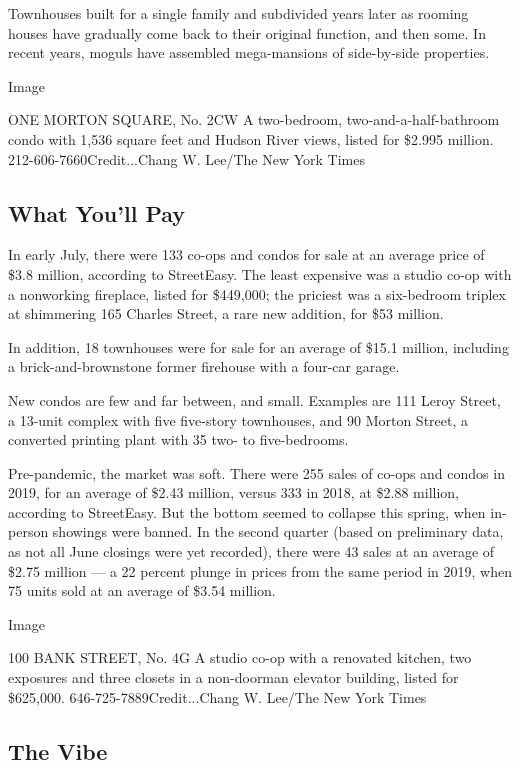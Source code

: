 Townhouses built for a single family and subdivided years later as
rooming houses have gradually come back to their original function, and
then some. In recent years, moguls have assembled mega-mansions of
side-by-side properties.

Image

ONE MORTON SQUARE, No. 2CW \textbar{} A two-bedroom,
two-and-a-half-bathroom condo with 1,536 square feet and Hudson River
views, listed for \$2.995 million. 212-606-7660Credit...Chang W. Lee/The
New York Times

\hypertarget{what-youll-pay}{%
\subsection{What You'll Pay}\label{what-youll-pay}}

In early July, there were 133 co-ops and condos for sale at an average
price of \$3.8 million, according to StreetEasy. The least expensive was
a studio co-op with a nonworking fireplace, listed for \$449,000; the
priciest was a six-bedroom triplex at shimmering 165 Charles Street, a
rare new addition, for \$53 million.

In addition, 18 townhouses were for sale for an average of \$15.1
million, including a brick-and-brownstone former firehouse with a
four-car garage.

New condos are few and far between, and small. Examples are 111 Leroy
Street, a 13-unit complex with five five-story townhouses, and 90 Morton
Street, a converted printing plant with 35 two- to five-bedrooms.

Pre-pandemic, the market was soft. There were 255 sales of co-ops and
condos in 2019, for an average of \$2.43 million, versus 333 in 2018, at
\$2.88 million, according to StreetEasy. But the bottom seemed to
collapse this spring, when in-person showings were banned. In the second
quarter (based on preliminary data, as not all June closings were yet
recorded), there were 43 sales at an average of \$2.75 million --- a 22
percent plunge in prices from the same period in 2019, when 75 units
sold at an average of \$3.54 million.

Image

100 BANK STREET, No. 4G \textbar{} A studio co-op with a renovated
kitchen, two exposures and three closets in a non-doorman elevator
building, listed for \$625,000. 646-725-7889Credit...Chang W. Lee/The
New York Times

\hypertarget{the-vibe}{%
\subsection{The Vibe}\label{the-vibe}}

